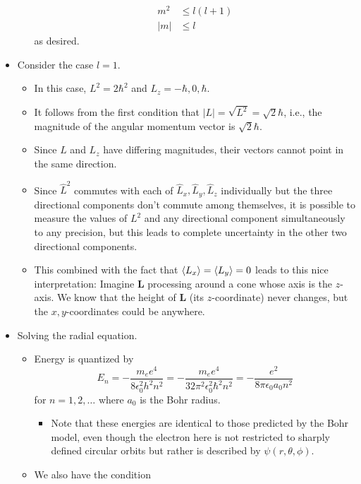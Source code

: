 \documentclass[../notes.tex]{subfiles}
\begin{document}
\begin{itemize}
\begin{itemize}
\begin{align*}
            m^2 &\leq l(l+1)\\
            |m| &\leq l
        \end{align*}
        as desired.
    \end{itemize}
    \item Consider the case $l=1$.
    \begin{itemize}
        \item In this case, $L^2=2\hbar^2$ and $L_z=-\hbar,0,\hbar$.
        \item It follows from the first condition that $|L|=\sqrt{L^2}=\sqrt{2}\hbar$, i.e., the magnitude of the angular momentum vector is $\sqrt{2}\hbar$.
        \item Since $L$ and $L_z$ have differing magnitudes, their vectors cannot point in the same direction.
        \item Since $\hat{L}^2$ commutes with each of $\hat{L}_x,\hat{L}_y,\hat{L}_z$ individually but the three directional components don't commute among themselves, it is possible to measure the values of $L^2$ and any directional component simultaneously to any precision, but this leads to complete uncertainty in the other two directional components.
        \item This combined with the fact that $\langle{L_x}\rangle=\langle{L_y}\rangle=0$ leads to this nice interpretation: Imagine $\mathbf{L}$ processing around a cone whose axis is the $z$-axis. We know that the height of $\mathbf{L}$ (its $z$-coordinate) never changes, but the $x,y$-coordinates could be anywhere.
    \end{itemize}
    \item Solving the radial equation.
    \begin{itemize}
        \item Energy is quantized by
        \begin{equation*}
            E_n = -\frac{m_ee^4}{8\epsilon_0^2h^2n^2}
            = -\frac{m_ee^4}{32\pi^2\epsilon_0^2\hbar^2n^2}
            = -\frac{e^2}{8\pi\epsilon_0a_0n^2}
        \end{equation*}
        for $n=1,2,\dots$ where $a_0$ is the Bohr radius.
        \begin{itemize}
            \item Note that these energies are identical to those predicted by the Bohr model, even though the electron here is not restricted to sharply defined circular orbits but rather is described by $\psi(r,\theta,\phi)$.
        \end{itemize}
        \item We also have the condition

\end{itemize}
\end{itemize}
\end{document}
